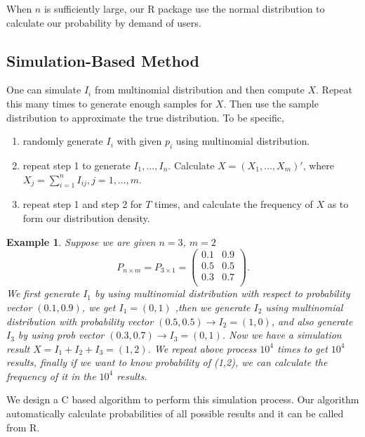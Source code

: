\documentclass[12pt]{article}
\newtheorem{example}{Example}
\begin{document}
When $n$ is sufficiently large, our R package use the normal distribution to calculate our probability by demand of users.


\subsection{Simulation-Based Method}
One can simulate $I_i$ from multinomial distribution and then compute $X$. Repeat this many times to generate enough samples for $X$. Then use the sample distribution to approximate the true distribution.
To be specific,
\begin{enumerate}[Step 1]
    \item randomly generate $I_i$ with given $p_i$ using multinomial distribution.
    \item repeat step 1 to generate $I_1,\dots,I_n$. Calculate $X = (X_1,\dots,X_{m})'$, where $X_j = \sum_{i=1}^{n}I_{ij}, j=1,\dots,m$.
    \item repeat step 1 and step 2 for $T$ times, and calculate the frequency of $X$ as to form our distribution density.
\end{enumerate}
\begin{example}
Suppose we are given $n=3$, $m=2$
\begin{equation*}
P_{n \times m} = P_{3 \times 1} = \begin{pmatrix}
0.1 & 0.9\\
0.5 & 0.5\\
0.3 & 0.7\\
\end{pmatrix}.
\end{equation*}
We first generate $I_1$ by using multinomial distribution with respect to probability vector $(0.1,0.9)$, we get $I_1 = (0,1)$  ,then we generate $I_2$ using multinomial distribution with probability vector $(0.5,0.5) \rightarrow I_2 = (1,0)$, and also generate $I_3$ by using prob vector $(0.3,0.7) \rightarrow I_3 = (0,1)$. Now we have a simulation result $X = I_1+I_2+I_3 = (1,2)$. We repeat above process $10^4$ times to get $10^4$ results, finally if we want to know probability of (1,2), we can calculate the frequency of it in the $10^4$ results.
\end{example}
We design a C based algorithm to perform this simulation process. Our algorithm automatically calculate probabilities of all possible results and it can be called from R.\\
\end{document}
